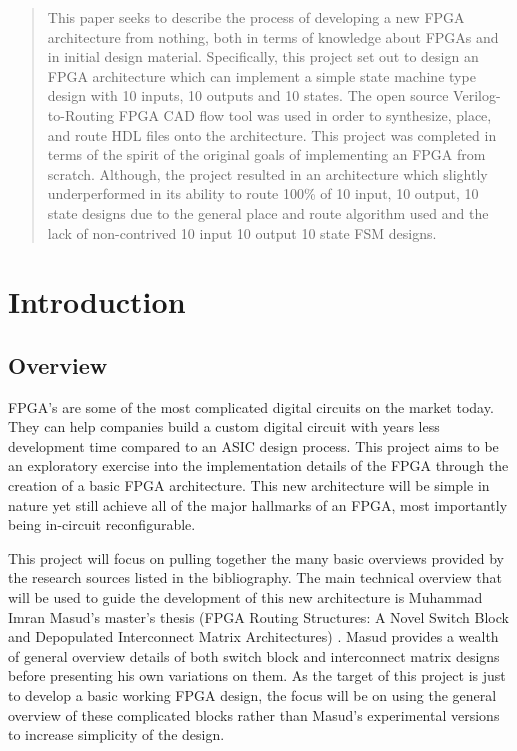 \documentclass[12pt]{article}
\begin{document}
\begin{abstract}
This paper seeks to describe the process of developing a new FPGA architecture from 
nothing, both in terms of knowledge about FPGAs and in initial design material. Specifically,
this project set out to design an FPGA architecture which can implement a simple 
state machine type design with 10 inputs, 10 outputs and 10 states.
The open source Verilog-to-Routing FPGA CAD flow tool was used in order to
synthesize, place, and route HDL files onto the architecture. 
This project was completed in terms of the spirit of the original goals of implementing
an FPGA from scratch. Although, the project resulted in an architecture which slightly underperformed
in its ability to route 100\% of 10 input, 10 output, 10 state designs due to 
the general place and route algorithm used and the lack of non-contrived 10 input
10 output 10 state FSM designs.

\end{abstract}
\newpage

\tableofcontents
\newpage
\listoffigures
\newpage

\section{Introduction}

\subsection{Overview}

FPGA’s are some of the most complicated digital circuits on the market today. They 
can help companies build a custom digital circuit with years less development time 
compared to an ASIC design process. This project aims to be an exploratory exercise
into the implementation details of the FPGA through the creation 
of a basic FPGA architecture. This new architecture will be simple in nature yet still
achieve all of the major hallmarks of an FPGA, most importantly being in-circuit reconfigurable.

This project will focus on pulling together the many basic overviews provided by 
the research sources listed in the bibliography. The main technical overview that will 
be used to guide the development of this new architecture is Muhammad Imran Masud’s
master's thesis (FPGA Routing Structures: A Novel Switch Block and Depopulated 
Interconnect Matrix Architectures) \cite{masud_1999}. Masud provides a wealth of general overview details 
of both switch block and interconnect matrix designs before presenting his own variations 
on them. As the target of this project is just to develop a basic working FPGA design,
the focus will be on using the general overview of these complicated blocks rather 
than Masud’s experimental versions to increase simplicity of the design.
\end{document}
